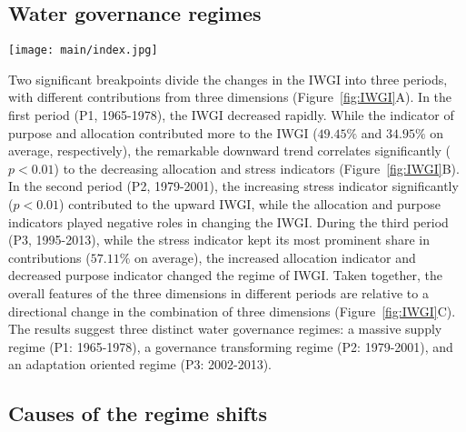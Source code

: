 \subsection{Water governance regimes}
\label{Res.1}

\begin{figure*}[ht!]
	\centering
	\texttt{[image: main/index.jpg]}
	\caption{Changes in the IWGI index and corresponding water governance regimes: P1: 1965-1978, P2: 1979-2001, and P3: 2002-2013.
	\textbf{A,} detecting change points of IWGI and contributions from each indicator. Two significant change points ($p<0.01$) occurred in 1978 and 2001.
	\textbf{B,} correlation of trends between the IWGI and the indicators.
	\textbf{C,} across three indicators, changing components of the IWGI, whose directions shifts between different regimes.
	}
	\label{fig:IWGI}
\end{figure*}

Two significant breakpoints divide the changes in the IWGI into three periods, with different contributions from three dimensions (Figure~\ref{fig:IWGI}A).
In the first period (P1, 1965-1978), the IWGI decreased rapidly.
While the indicator of purpose and allocation contributed more to the IWGI ($49.45\%$ and $34.95\%$ on average, respectively), the remarkable downward trend correlates significantly ($p<0.01$) to the decreasing allocation and stress indicators (Figure~\ref{fig:IWGI}B).
In the second period (P2, 1979-2001), the increasing stress indicator significantly ($p<0.01$) contributed to the upward IWGI, while the allocation and purpose indicators played negative roles in changing the IWGI.
During the third period (P3, 1995-2013), while the stress indicator kept its most prominent share in contributions ($57.11\%$ on average), the increased allocation indicator and decreased purpose indicator changed the regime of IWGI.
Taken together, the overall features of the three dimensions in different periods are relative to a directional change in the combination of three dimensions (Figure~\ref{fig:IWGI}C).
The results suggest three distinct water governance regimes: a massive supply regime (P1: 1965-1978), a governance transforming regime (P2: 1979-2001), and an adaptation oriented regime (P3: 2002-2013).

\subsection{Causes of the regime shifts}
\label{Res.2}

